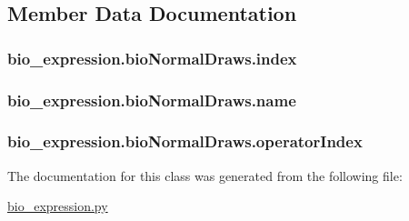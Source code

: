 \subsection{Member Data Documentation}
\hypertarget{classbio__expression_1_1bio_normal_draws_a5e8ba3573b5e4c8944d22d55fc1a2962}{
\subsubsection[{index}]{\setlength{\rightskip}{0pt plus 5cm}bio\+\_\+expression.\+bio\+Normal\+Draws.\+index}}\label{classbio__expression_1_1bio_normal_draws_a5e8ba3573b5e4c8944d22d55fc1a2962}
\hypertarget{classbio__expression_1_1bio_normal_draws_a19eeeea8d6a800cfb132da8ee32407c8}{
\subsubsection[{name}]{\setlength{\rightskip}{0pt plus 5cm}bio\+\_\+expression.\+bio\+Normal\+Draws.\+name}}\label{classbio__expression_1_1bio_normal_draws_a19eeeea8d6a800cfb132da8ee32407c8}
\hypertarget{classbio__expression_1_1bio_normal_draws_a792d7baa7f509b11688b54a15b9f9ed0}{
\subsubsection[{operator\+Index}]{\setlength{\rightskip}{0pt plus 5cm}bio\+\_\+expression.\+bio\+Normal\+Draws.\+operator\+Index}}\label{classbio__expression_1_1bio_normal_draws_a792d7baa7f509b11688b54a15b9f9ed0}


The documentation for this class was generated from the following file\+:\begin{DoxyCompactItemize}
\item 
\hyperlink{bio__expression_8py}{bio\+\_\+expression.\+py}\end{DoxyCompactItemize}
